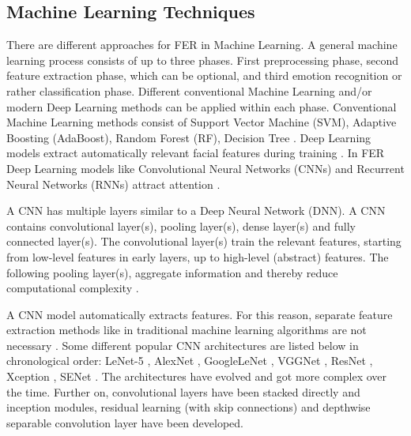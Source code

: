 \documentclass[a4paper, conference]{IEEEtran}
\begin{document}
\subsection{Machine Learning Techniques}
There are different approaches for FER in Machine Learning. A general machine learning process consists of up to three phases. First preprocessing phase, second feature extraction phase, which can be optional, and third emotion recognition or rather classification phase. Different conventional Machine Learning and/or modern Deep Learning methods can be applied within each phase. Conventional Machine Learning methods consist of Support Vector Machine (SVM), Adaptive Boosting (AdaBoost), Random Forest (RF), Decision Tree \cite{ekundayoFacialExpressionRecognition2021}. Deep Learning models extract automatically relevant facial features during training  \cite{liuAdaptiveDeepMetric2017, yangFacialExpressionRecognition2018}. In FER Deep Learning models like Convolutional Neural Networks (CNNs) and Recurrent Neural Networks (RNNs) attract attention \cite{ekundayoFacialExpressionRecognition2021}.

A CNN has multiple layers similar to a Deep Neural Network (DNN). A CNN contains convolutional layer(s), pooling layer(s), dense layer(s) and fully connected layer(s). The convolutional layer(s) train the relevant features, starting from low-level features in early layers, up to high-level (abstract) features. The following pooling layer(s), aggregate information and thereby reduce computational complexity \cite{lecunGradientbasedLearningApplied1998}.

A CNN model automatically extracts features. For this reason, separate feature extraction methods like in traditional machine learning algorithms are not necessary \cite{ekundayoFacialExpressionRecognition2021}. Some different popular CNN architectures are listed below in chronological order: LeNet-5 \cite{lecunGradientbasedLearningApplied1998}, AlexNet \cite{krizhevskyImagenetClassificationDeep2012}, GoogleLeNet \cite{szegedyGoingDeeperConvolutions2015a}, VGGNet \cite{simonyanVeryDeepConvolutional2015}, ResNet \cite{heDeepResidualLearning2016}, Xception \cite{cholletXceptionDeepLearning2017}, SENet \cite{huSqueezeandExcitationNetworks2018}. The architectures have evolved and got more complex over the time. Further on, convolutional layers have been stacked directly and inception modules, residual learning (with skip connections) and depthwise separable convolution layer have been developed.
\end{document}
